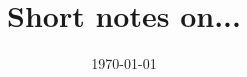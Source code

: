 \documentclass[12pt,a4paper]{amsart}
\title[Short notes on...]{Short notes on...}
\author[Pedro N\'{u}\~{n}ez]{}
\date{\today}
\theoremstyle{plain}
\theoremstyle{definition}
\theoremstyle{remark}
\begin{document}
\maketitle

\tableofcontents

\printbibliography
\vfill
\end{document}

